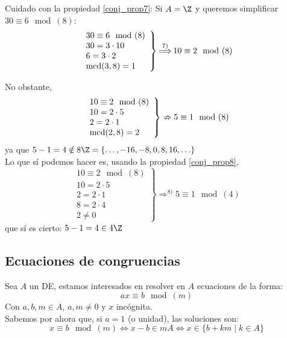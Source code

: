 Cuidado con la propiedad \ref{conj_prop7}: Si $A = \Z$ y queremos simplificar $30\equiv 6\mod(8)$:
$$\left. \begin{array}{l}
        30\equiv 6\mod(8) \\
        30 = 3\cdot 10    \\
        6 = 3 \cdot 2     \\
        \operatorname{mcd}(3,8)=1
    \end{array} \right\} \mathop{\Longrightarrow}^{7)} 10 \equiv 2\mod(8)$$

No obstante,
$$\left. \begin{array}{l}
        10 \equiv 2\mod(8) \\
        10 = 2 \cdot 5     \\
        2 = 2 \cdot 1      \\
        \operatorname{mcd}(2,8) = 2
    \end{array} \right\} \nRightarrow 5\equiv 1\mod(8)$$
ya que $5-1 = 4 \notin 8\Z = \{\ldots, -16, -8, 0, 8, 16, \ldots\}$\\


Lo que sí podemos hacer es, usando la propiedad \ref{conj_prop8},
$$\left. \begin{array}{l}
        10 \equiv 2\mod(8) \\
        10 = 2 \cdot 5     \\
        2 = 2 \cdot 1      \\
        8 = 2 \cdot 4      \\
        2 \neq 0
    \end{array} \right\} \mathop{\Longrightarrow}^{8)} 5 \equiv 1\mod(4)$$
que sí es cierto: $5-1 = 4 \in 4\Z$

\subsection{Ecuaciones de congruencias}

Sea $A$ un DE, estamos interesados en resolver en $A$ ecuaciones de la forma:
$$ax\equiv b\mod(m)$$
Con $a,b,m \in A$, $a,m \neq 0$ y $x$ incógnita.\\


Sabemos por ahora que, si $a=1$ (o unidad), las soluciones son:
$$x\equiv b\mod(m) \Longleftrightarrow x-b \in mA \Longleftrightarrow x \in \{b+km \mid k \in A\}$$

